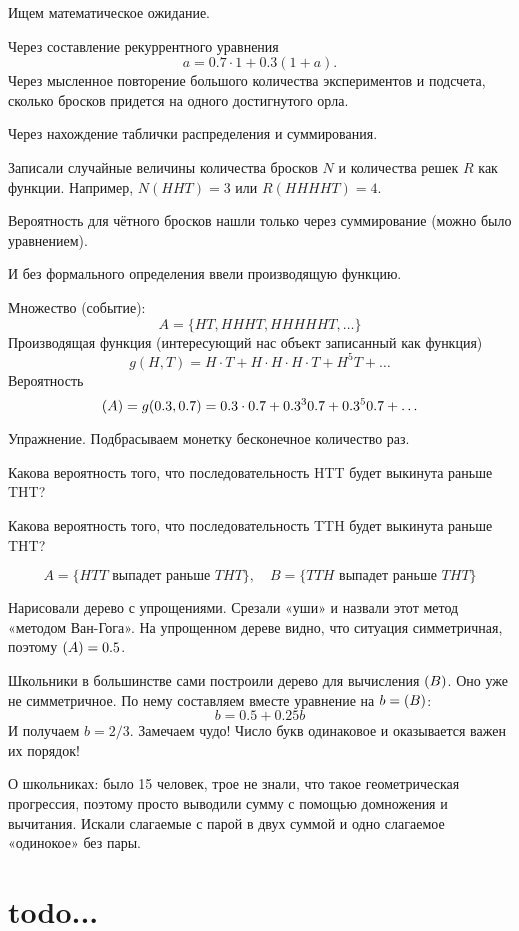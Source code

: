 \documentclass[12pt]{article}
\let\P\relax
\DeclareMathOperator{\P}{\mathbb{P}}
\theoremstyle{definition}
\begin{document}
Ищем математическое ожидание. 

Через составление рекуррентного уравнения
\[
a = 0.7 \cdot 1 + 0.3 (1 + a).
\]
Через мысленное повторение большого количества экспериментов и подсчета, сколько бросков придется на одного достигнутого орла. 

Через нахождение таблички распределения и суммирования. 

Записали случайные величины количества бросков $N$ и количества решек $R$ как функции. 
Например, $N(HHT) = 3$ или $R(HHHHT)= 4$.

Вероятность для чётного бросков нашли только через суммирование (можно было уравнением).

И без формального определения ввели производящую функцию. 

Множество (событие):
\[
A = \{HT, HHHT, HHHHHT, \ldots\}
\]
Производящая функция (интересующий нас объект записанный как функция)
\[
g(H, T) = H\cdot T + H\cdot H\cdot H\cdot T + H^5T + \ldots  
\]
Вероятность
\[
\P(A) = g(0.3, 0.7) = 0.3 \cdot 0.7 + 0.3^3 0.7 + 0.3^5 0.7 + \ldots  
\]


Упражнение. Подбрасываем монетку бесконечное количество раз. 

Какова вероятность того, что последовательность HTT будет выкинута раньше THT?

Какова вероятность того, что последовательность TTH будет выкинута раньше THT?

\[
A = \{HTT \text{ выпадет раньше } THT\}, \quad  B = \{TTH \text{ выпадет раньше } THT\}
\]

Нарисовали дерево с упрощениями. Срезали «уши» и назвали этот метод «методом Ван-Гога».
На упрощенном дереве видно, что ситуация симметричная, поэтому $\P(A) = 0.5$.

Школьники в большинстве сами построили дерево для вычисления $\P(B)$. Оно уже не симметричное.
По нему составляем вместе уравнение на $b=\P(B)$:
\[
b = 0.5 + 0.25b  
\]
И получаем $b=2/3$. Замечаем чудо! Число букв одинаковое и оказывается важен их порядок!


О школьниках: было 15 человек, трое не знали, что такое геометрическая прогрессия, 
поэтому просто выводили сумму с помощью домножения и вычитания. 
Искали слагаемые с парой в двух суммой и одно слагаемое «одинокое» без пары. 


\section{todo...}
\end{document}

